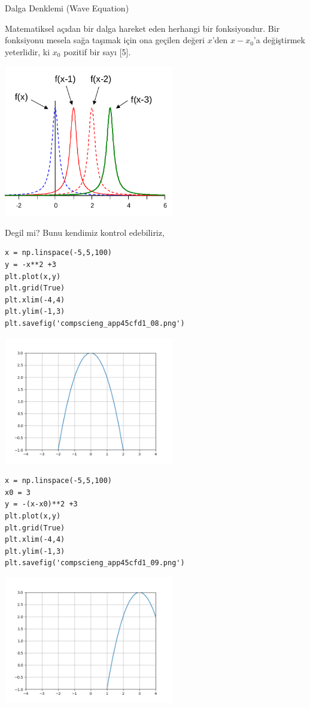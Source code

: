 \documentclass[12pt,fleqn]{article}\usepackage{../../common}
\begin{document}
Dalga Denklemi (Wave Equation)

Matematiksel açıdan bir dalga hareket eden herhangi bir fonksiyondur. Bir
fonksiyonu mesela sağa taşımak için ona geçilen değeri $x$'den $x-x_0$'a
değiştirmek yeterlidir, ki $x_0$ pozitif bir sayı [5].

\includegraphics[width=20em]{compscieng_app45cfd1_07.png}

Degil mi? Bunu kendimiz kontrol edebiliriz,

\begin{verbatim}
x = np.linspace(-5,5,100)
y = -x**2 +3
plt.plot(x,y)
plt.grid(True)
plt.xlim(-4,4)
plt.ylim(-1,3)
plt.savefig('compscieng_app45cfd1_08.png')
\end{verbatim}

\includegraphics[width=20em]{compscieng_app45cfd1_08.png}

\begin{verbatim}
x = np.linspace(-5,5,100)
x0 = 3
y = -(x-x0)**2 +3
plt.plot(x,y)
plt.grid(True)
plt.xlim(-4,4)
plt.ylim(-1,3)
plt.savefig('compscieng_app45cfd1_09.png')
\end{verbatim}

\includegraphics[width=20em]{compscieng_app45cfd1_09.png}
\end{document}
